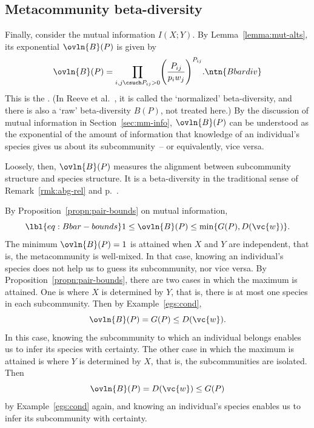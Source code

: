 \subsection*{Metacommunity beta-diversity}

Finally, consider the mutual%
% 
% 
information $I(X; Y)$.  By
Lemma~\ref{lemma:mut-alts}, its exponential
$\ovln{B}(P)$ is given by
\[
\ovln{B}(P)
=
\prod_{i, j \csuch P_{ij} > 0}
\Biggl( \frac{P_{ij}}{p_i w_j} \Biggr)^{P_{ij}}.
\ntn{Bbardiv}
\]
This is the .  (In Reeve et al.~\cite{HPD}, it is called the
`normalized' beta-diversity, and there is also a `raw' beta-diversity
$B(P)$, not treated here.)  By the discussion of mutual information in
Section~\ref{sec:mm-info}, $\ovln{B}(P)$ can be understood as the
exponential of the amount of information that knowledge of an individual's
species gives us about its subcommunity~-- or equivalently, vice versa.

Loosely, then, $\ovln{B}(P)$ measures the alignment between subcommunity
structure and species structure.  It is a beta-diversity in the traditional
sense of Remark~\ref{rmk:abg-rel} and p.~\pageref{p:beta-bet}.

By Proposition~\ref{propn:pair-bounds} on mutual
information,
% 
\begin{equation}
\lbl{eq:Bbar-bounds}
1 \leq \ovln{B}(P) \leq \min \{G(P), D(\vc{w})\}.  
\end{equation}
% 
The minimum $\ovln{B}(P) = 1$ is attained when $X$ and $Y$ are independent,
that is, the metacommunity is well-mixed.  In that case, knowing an
individual's species does not help us to guess its subcommunity,
nor vice versa.  
% 
By Proposition~\ref{propn:pair-bounds}, there are two
cases in which the maximum is attained.  One is where $X$ is determined by
$Y$, that is, there is at most one species in each subcommunity.  Then by
Example~\ref{egs:cond},
% 
\[
\ovln{B}(P) = G(P) \leq D(\vc{w}).
\]
% 
In this case, knowing the subcommunity to which an individual belongs
enables us to infer its species with certainty.  The other case in which
the maximum is attained is where $Y$ is determined by $X$, that is, the
subcommunities are isolated.  Then
\[
\ovln{B}(P) = D(\vc{w}) \leq G(P)
\]
by Example~\ref{egs:cond} again, and knowing an
individual's species enables us to infer its subcommunity with certainty.

